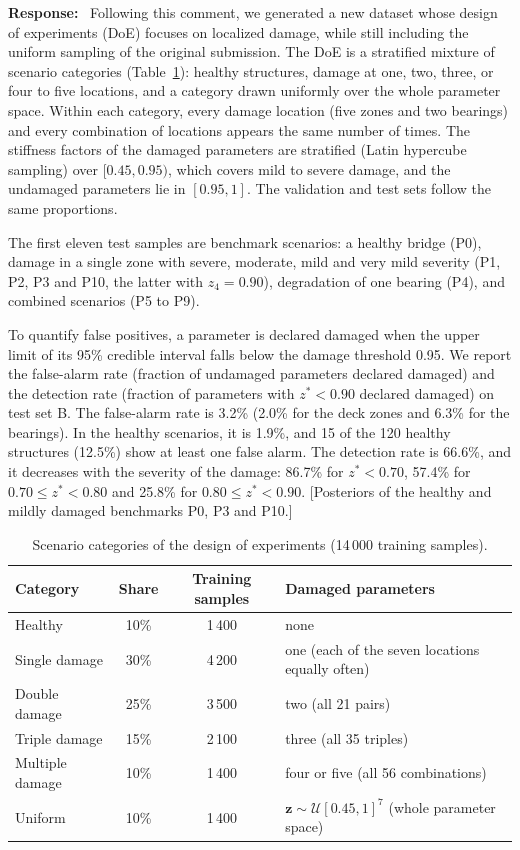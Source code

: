 \documentclass[11pt]{article}
\newenvironment{response}{\par\smallskip\noindent\color{resp}\textbf{Response:}\ }{\par}
\newcommand{\tbd}[1]{\textcolor{note}{\textsf{[#1]}}}
\newcommand{\z}{\mathbf{z}}
\begin{document}
\begin{response}
Following this comment, we generated a new dataset whose design of experiments (DoE) focuses on localized damage, while
still including the uniform sampling of the original submission. The DoE is a stratified mixture of scenario categories
(Table~\ref{tab:doe}): healthy structures, damage at one, two, three, or four to five locations, and a category drawn
uniformly over the whole parameter space. Within each category, every damage location (five zones and two bearings) and
every combination of locations appears the same number of times. The stiffness factors of the damaged parameters are
stratified (Latin hypercube sampling) over $[0.45,0.95)$, which covers mild to severe damage, and the undamaged
parameters lie in $[0.95,1]$. The validation and test sets follow the same proportions.

The first eleven test samples are benchmark scenarios: a healthy bridge (P0), damage in a single zone with severe,
moderate, mild and very mild severity (P1, P2, P3 and P10, the latter with $z_4=0.90$), degradation of one bearing (P4),
and combined scenarios (P5 to P9).

To quantify false positives, a parameter is declared damaged when the upper limit of its 95\% credible interval falls
below the damage threshold 0.95. We report the false-alarm rate (fraction of undamaged parameters declared damaged) and the
detection rate (fraction of parameters with $z^*<0.90$ declared damaged) on test set B. The false-alarm rate is 3.2\%
(2.0\% for the deck zones and 6.3\% for the bearings). In the healthy scenarios, it is 1.9\%, and 15 of the 120 healthy
structures (12.5\%) show at least one false alarm. The detection rate is 66.6\%, and it decreases with the severity of
the damage: 86.7\% for $z^*<0.70$, 57.4\% for $0.70\le z^*<0.80$ and 25.8\% for $0.80\le z^*<0.90$.
\tbd{Posteriors of the healthy and mildly damaged benchmarks P0, P3 and P10.}
\end{response}

\begin{table}[H]
\centering\small
\caption{Scenario categories of the design of experiments (14\,000 training samples).}
\label{tab:doe}
\begin{tabular}{lccl}
\toprule
Category & Share & Training samples & Damaged parameters \\
\midrule
Healthy & 10\% & 1\,400 & none \\
Single damage & 30\% & 4\,200 & one (each of the seven locations equally often) \\
Double damage & 25\% & 3\,500 & two (all 21 pairs) \\
Triple damage & 15\% & 2\,100 & three (all 35 triples) \\
Multiple damage & 10\% & 1\,400 & four or five (all 56 combinations) \\
Uniform & 10\% & 1\,400 & $\z\sim\mathcal{U}[0.45,1]^7$ (whole parameter space) \\
\bottomrule
\end{tabular}
\end{table}
\end{document}
